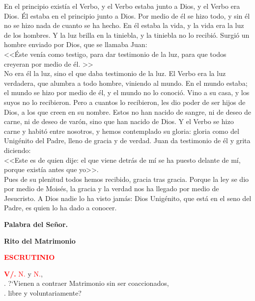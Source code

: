 \documentclass[12pt, letterpaper]{report}
\begin{document}
\Large En el principio exist\'ia el Verbo, y el Verbo estaba junto a Dios, y el Verbo era Dios. \'El estaba en el principio junto a Dios. Por medio de \'el se hizo todo, y sin \'el no se hizo nada de cuanto se ha hecho. En \'el estaba la vida, y la vida era la luz de los hombres. Y la luz brilla en la tiniebla, y la tiniebla no lo recibi\'o. Surgi\'o un hombre enviado por Dios, que se llamaba Juan: \\ 
<<\'Este ven\'ia como testigo, para dar testimonio de la luz, para que todos creyeran por medio de \'el. >> \\
No era \'el la luz, sino el que daba testimonio de la luz. El Verbo era la luz verdadera, que alumbra a todo hombre, viniendo al mundo. En el mundo estaba; el mundo se hizo por medio de \'el, y el mundo no lo conoci\'o. Vino a su casa, y los suyos no lo recibieron. Pero a cuantos lo recibieron, les dio poder de ser hijos de Dios, a los que creen en su nombre. Estos no han nacido de sangre, ni de deseo de carne, ni de deseo de var\'on, sino que han nacido de Dios. Y el Verbo se hizo carne y habit\'o entre nosotros, y hemos contemplado su gloria: gloria como del Unig\'enito del Padre, lleno de gracia y de verdad. Juan da testimonio de \'el y grita diciendo: \\
<<Este es de quien dije: el que viene detr\'as de m\'i se ha puesto delante de m\'i, porque exist\'ia antes que yo>>. \\
Pues de su plenitud todos hemos recibido, gracia tras gracia. Porque la ley se dio por medio de Mois\'es, la gracia y la verdad nos ha llegado por medio de Jesucristo. A Dios nadie lo ha visto jam\'as: Dios Unig\'enito, que est\'a en el seno del Padre, es quien lo ha dado a conocer. \newline

{\bfseries Palabra del Se\~nor.}

\newpage

\begin{center}
\Huge {\bfseries Rito del Matrimonio}
\end{center}

\vspace{1cm}

\Large {\bfseries \textcolor{red}{ESCRUTINIO}} \newline

\Large \hspace{-0.9cm} {\bfseries \textcolor{red}{V/.}} \hspace{0.5cm}  \textcolor{red}{N.} y \textcolor{red}{N.}, \\
. \hspace{1cm} ?`Vienen a contraer Matrimonio sin ser coaccionados, \\
. \hspace{1cm} libre y voluntariamente? \newline
\end{document}
